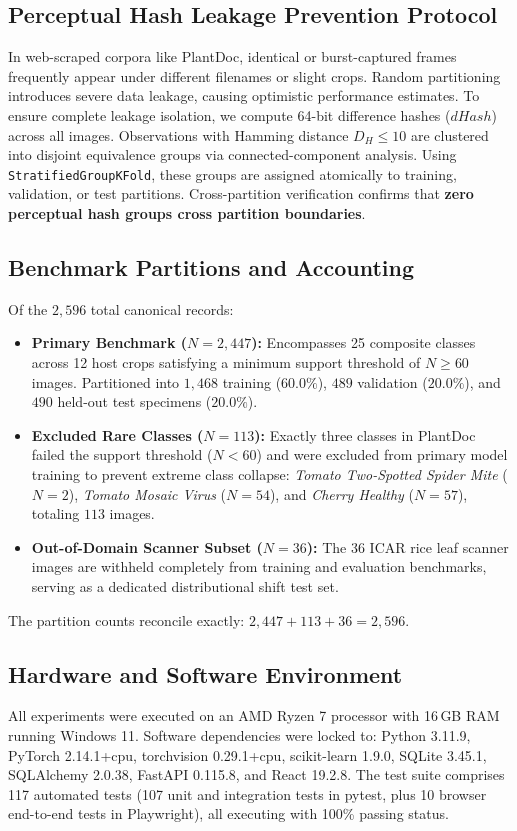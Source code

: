 \documentclass[conference,a4paper]{IEEEtran}
\begin{document}
\subsection{Perceptual Hash Leakage Prevention Protocol}
In web-scraped corpora like PlantDoc, identical or burst-captured frames frequently appear under different filenames or slight crops. Random partitioning introduces severe data leakage, causing optimistic performance estimates. To ensure complete leakage isolation, we compute 64-bit difference hashes ($dHash$)~\cite{zauner2010dhash} across all images. Observations with Hamming distance $D_H \le 10$ are clustered into disjoint equivalence groups via connected-component analysis. Using \texttt{StratifiedGroupKFold}, these groups are assigned atomically to training, validation, or test partitions. Cross-partition verification confirms that \textbf{zero perceptual hash groups cross partition boundaries}.

\subsection{Benchmark Partitions and Accounting}
Of the $2,596$ total canonical records:
\begin{itemize}
    \item \textbf{Primary Benchmark ($N=2,447$):} Encompasses 25 composite classes across 12 host crops satisfying a minimum support threshold of $N \ge 60$ images. Partitioned into $1,468$ training ($60.0\%$), $489$ validation ($20.0\%$), and $490$ held-out test specimens ($20.0\%$).
    \item \textbf{Excluded Rare Classes ($N=113$):} Exactly three classes in PlantDoc failed the support threshold ($N < 60$) and were excluded from primary model training to prevent extreme class collapse: \textit{Tomato Two-Spotted Spider Mite} ($N=2$), \textit{Tomato Mosaic Virus} ($N=54$), and \textit{Cherry Healthy} ($N=57$), totaling $113$ images.
    \item \textbf{Out-of-Domain Scanner Subset ($N=36$):} The 36 ICAR rice leaf scanner images are withheld completely from training and evaluation benchmarks, serving as a dedicated distributional shift test set.
\end{itemize}
The partition counts reconcile exactly: $2,447 + 113 + 36 = 2,596$.

\subsection{Hardware and Software Environment}
All experiments were executed on an AMD Ryzen 7 processor with 16\,GB RAM running Windows 11. Software dependencies were locked to: Python 3.11.9, PyTorch 2.14.1+cpu, torchvision 0.29.1+cpu, scikit-learn 1.9.0, SQLite 3.45.1, SQLAlchemy 2.0.38, FastAPI 0.115.8, and React 19.2.8. The test suite comprises 117 automated tests (107 unit and integration tests in pytest, plus 10 browser end-to-end tests in Playwright), all executing with 100\% passing status.
\end{document}
